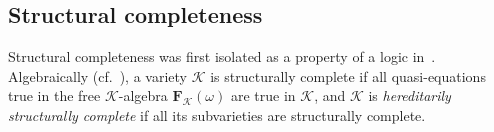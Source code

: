 \documentclass{amsart}
\newtheorem{theorem}{Theorem}[section]
\newtheorem{example}[theorem]{Example}
\newcommand{\alg}[1]{\mathbf{#1}}
\newcommand{\var}[1]{\mathsf{#1}}
\newcommand{\cm}[1]{\mathrm{Cm}\, #1}
\def\pw{\mathscr{P}}
\begin{document}








\subsection{Structural completeness}
Structural completeness was first isolated as a property of a logic
in~\cite{Pog71}. Algebraically (cf.~\cite{Ber91}), a variety $\mathcal{K}$ is 
structurally complete if all quasi-equations true in the free 
$\mathcal{K}$-algebra $\alg{F}_\mathcal{K}(\omega)$ are true in $\mathcal{K}$,
and $\mathcal{K}$ is \emph{hereditarily structurally complete}  
if all its subvarieties are structurally complete.
\end{document}
